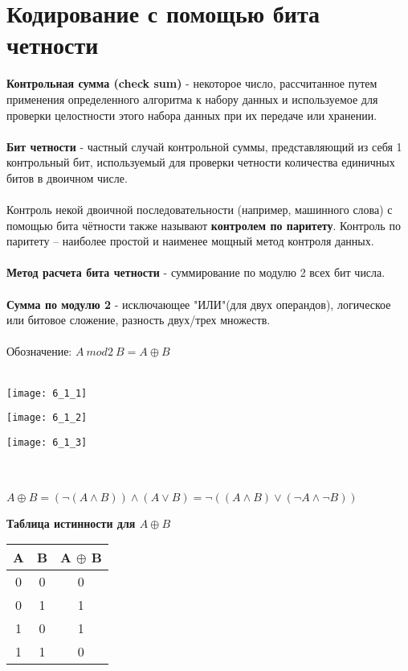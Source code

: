 \section{Кодирование с помощью бита четности}
\textbf{Контрольная сумма (check sum)} - некоторое число, рассчитанное путем применения определенного алгоритма к набору данных и используемое для проверки целостности этого набора данных при их передаче или хранении.
\\
\\\textbf{Бит четности} - частный случай контрольной суммы, представляющий из себя 1 контрольный бит, используемый для проверки четности количества единичных битов в двоичном числе.
\\
\\Контроль некой двоичной последовательности (например, машинного слова) с помощью бита чётности также называют \textbf{контролем по паритету}. Контроль по паритету -- наиболее простой и наименее мощный метод контроля данных.
\\
\\\textbf{Метод расчета бита четности} - суммирование по модулю 2 всех бит числа.
\\
\\\textbf{Сумма по модулю 2} - исключающее "ИЛИ"(для двух операндов), логическое или битовое сложение, разность двух/трех множеств.
\\
\\Обозначение: $A\ mod2\ B = A \oplus B$
\\
\\
\begin{minipage}[l]{3.5cm}
\texttt{[image: 6\_1\_1]}
\end{minipage}
\begin{minipage}[c]{3.5cm}
\texttt{[image: 6\_1\_2]}
\end{minipage}
\begin{minipage}[r]{3.5cm}
\texttt{[image: 6\_1\_3]}
\end{minipage}
\\
\\
$A \oplus B = (\neg(A\wedge B))\wedge(A\vee B) = \neg((A\wedge B)\vee(\neg A\wedge \neg B))$
\\
\begin{center}
\textbf{Таблица истинности для $A \oplus B$}
\end{center}
\begin{minipage}[l]{4cm}
\begin{tabular}{|c|c|c|}
\hline
A & B & A $\oplus$ B \\
\hline
0 & 0 & 0 \\
0 & 1 & 1 \\
1 & 0 & 1 \\
1 & 1 & 0 \\
\hline
\end{tabular}
\end{minipage}
